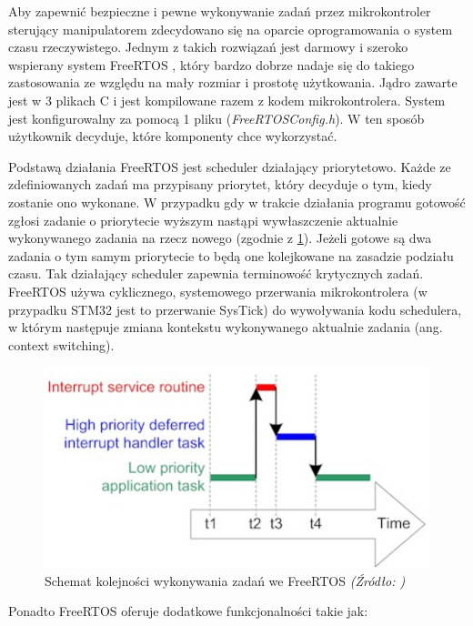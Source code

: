 \documentclass[a4paper, 12pt, twoside]{article}
\begin{document}
Aby zapewnić bezpieczne i pewne wykonywanie zadań przez mikrokontroler sterujący manipulatorem zdecydowano się na oparcie oprogramowania o system czasu rzeczywistego. Jednym z takich rozwiązań jest darmowy i szeroko wspierany system FreeRTOS \cite{freertos}, który bardzo dobrze nadaje się do takiego zastosowania ze względu na mały rozmiar i prostotę użytkowania. Jądro zawarte jest w 3 plikach C i jest kompilowane razem z kodem mikrokontrolera. System jest konfigurowalny za pomocą 1 pliku (\textit{FreeRTOSConfig.h}). W ten sposób użytkownik decyduje, które komponenty chce wykorzystać.

Podstawą działania FreeRTOS jest scheduler działający priorytetowo. Każde ze zdefiniowanych zadań ma przypisany priorytet, który decyduje o tym, kiedy zostanie ono wykonane. W przypadku gdy w trakcie działania programu gotowość zgłosi zadanie o priorytecie wyższym nastąpi wywłaszczenie aktualnie wykonywanego zadania na rzecz nowego (zgodnie z \ref{fig:freertos_scheduler}). Jeżeli gotowe są dwa zadania o tym samym priorytecie to będą one kolejkowane na zasadzie podziału czasu. Tak działający scheduler zapewnia terminowość krytycznych zadań. FreeRTOS używa cyklicznego, systemowego przerwania mikrokontrolera (w przypadku STM32 jest to przerwanie SysTick) do wywoływania kodu schedulera, w którym następuje zmiana kontekstu wykonywanego aktualnie zadania (ang. context switching).

\begin{figure}[hbt!]
\centering
\includegraphics[width=0.8\linewidth]{images/freertos_scheduler.png}
\caption{Schemat kolejności wykonywania zadań we FreeRTOS \textit{ (Źródło: \cite{freertos}) } }
\label{fig:freertos_scheduler}
\end{figure}

Ponadto FreeRTOS oferuje dodatkowe funkcjonalności takie jak:
\end{document}
